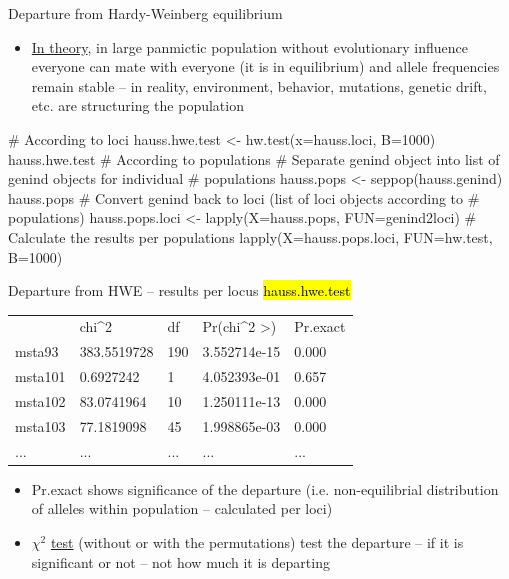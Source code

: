 \documentclass[compress, ucs, xelatex, 11pt, xcolor=svgnames,
  hyperref={
    bookmarks=true,
    unicode=true,
    colorlinks=true,
    pdftitle={Molecular data in R},
    plainpages=false,
    pdfauthor={Vojtech Zeisek},
    pdfsubject={Course about phylogeny and evolution in R},
    pdfcreator={XeLaTeX},
    pdfkeywords={R, evolution, phylogeny, molecular data},
    linkcolor=Tomato,
    anchorcolor=SaddleBrown,
    citecolor=Goldenrod,
    filecolor=DarkMagenta,
    menucolor=Sienna,
    urlcolor=DarkTurquoise,
    pdftex},
  url={hyphens, lowtilde} %
  ]{beamer}
\renewcommand{\texttt}[1]{\hl{\ttfamily #1}}
\begin{document}
\begin{frame}[fragile]{Departure from Hardy-Weinberg equilibrium}
  \begin{itemize}
    \item \href{https://en.wikipedia.org/wiki/Hardy%E2%80%93Weinberg_principle}{In theory}, in large panmictic population without evolutionary influence everyone can mate with everyone (it is in equilibrium) and allele frequencies remain stable -- in reality, environment, behavior, mutations, genetic drift, etc. are structuring the population
  \end{itemize}
  \begin{spluscode}
    # According to loci
    hauss.hwe.test <- hw.test(x=hauss.loci, B=1000)
    hauss.hwe.test
    # According to populations
    # Separate genind object into list of genind objects for individual
    # populations
    hauss.pops <- seppop(hauss.genind)
    hauss.pops
    # Convert genind back to loci (list of loci objects according to
    # populations)
    hauss.pops.loci <- lapply(X=hauss.pops, FUN=genind2loci)
    # Calculate the results per populations
    lapply(X=hauss.pops.loci, FUN=hw.test, B=1000)
  \end{spluscode}
\end{frame}

\begin{frame}[fragile]{Departure from HWE -- results per locus}
  \vfill
  \texttt{hauss.hwe.test}
  \begin{tabular}{lllll}
    & chi\textasciicircum2 & df & Pr(chi\textasciicircum2 >) & Pr.exact\\
    msta93 & 383.5519728 & 190 & 3.552714e-15 & 0.000\\
    msta101 & 0.6927242 & 1 & 4.052393e-01 & 0.657\\
    msta102 & 83.0741964 & 10 & 1.250111e-13 & 0.000\\
    msta103 & 77.1819098 & 45 & 1.998865e-03 & 0.000\\
    ... & ... & ... & ... & ...
  \end{tabular}
  \vfill
  \begin{itemize}
    \item Pr.exact shows significance of the departure (i.e. non-equilibrial distribution of alleles within population -- calculated per loci)
    \item $\chi^2$ \href{https://en.wikipedia.org/wiki/Pearson%27s_chi-squared_test}{test} (without or with the permutations) test the departure -- if it is significant or not -- not how much it is departing
  \end{itemize}
  \vfill
\end{frame}
\end{document}
